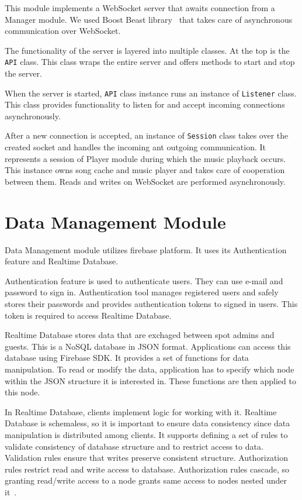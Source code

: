 This module implements a WebSocket server that awaits connection from a Manager module. We used Boost Beast library~\citep{beast} that takes care of asynchronous communication over WebSocket.
\par
The functionality of the server is layered into multiple classes. At the top is the \texttt{API} class. This class wraps the entire server and offers methods to start and stop the server.
\par
When the server is started, \texttt{API} class instance runs an instance of \texttt{Listener} class. This class provides functionality to listen for and accept incoming connections asynchronously.
\par
After a new connection is accepted, an instance of \texttt{Session} class takes over the created socket and handles the incoming ant outgoing communication. It represents a session of Player module during which the music playback occurs. This instance owns song cache and music player and takes care of cooperation between them. Reads and writes on WebSocket are performed asynchronously. 

\section{Data Management Module}

Data Management module utilizes firebase platform. It uses its Authentication feature and Realtime Database.
\par
Authentication feature is used to authenticate users. They can use e-mail and password to sign in. Authentication tool manages registered users and safely stores their passwords and provides authentication tokens to signed in users. This token is required to access Realtime Database.
\par
Realtime Database stores data that are exchaged between spot admins and guests. This is a NoSQL database in JSON format. Applications can access this database using Firebase SDK. It provides a set of functions for data manipulation. To read or modify the data, application has to specify which node within the JSON structure it is interested in. These functions are then applied to this node.
\par
In Realtime Database, clients implement logic for working with it. Realtime Database is schemaless, so it is important to ensure data consistency since data manipulation is distributed among clients. It supports defining a set of rules to validate consistency of database structure and to restrict access to data. Validation rules ensure that writes preserve consistent structure. Authorization rules restrict read and write access to database. Authorization rules cascade, so granting read/write access to a node grants same access to nodes nested under it~\citep{firebaseDocs}.

